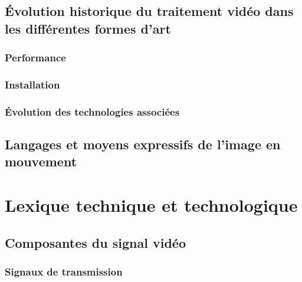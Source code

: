\documentclass[
]{book}
\begin{document}
\hypertarget{evolution_historique}{%
\section{Évolution historique du traitement vidéo dans les différentes formes d'art}\label{evolution_historique}}

\hypertarget{evolution_historique_performance}{%
\subsection{Performance}\label{evolution_historique_performance}}

\hypertarget{evolution_historique_installation}{%
\subsection{Installation}\label{evolution_historique_installation}}

\hypertarget{evolution_historique_technologies}{%
\subsection{Évolution des technologies associées}\label{evolution_historique_technologies}}

\hypertarget{evolution_historique_language}{%
\section{Langages et moyens expressifs de l'image en mouvement}\label{evolution_historique_language}}

\hypertarget{lexique}{%
\chapter{Lexique technique et technologique}\label{lexique}}

\hypertarget{composantes-du-signal-viduxe9o}{%
\section{Composantes du signal vidéo}\label{composantes-du-signal-viduxe9o}}

\hypertarget{signaux-de-transmission}{%
\subsection{Signaux de transmission}\label{signaux-de-transmission}}
\end{document}
